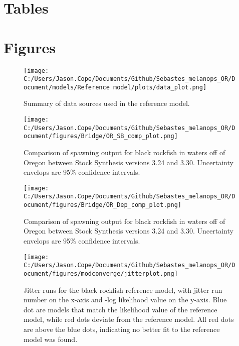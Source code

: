 \documentclass[11pt,
  english,
  letterpaper,
]{article}
\begin{document}
\clearpage

\hypertarget{tables}{%
\section{Tables}\label{tables}}

\clearpage

\hypertarget{figures}{%
\section{Figures}\label{figures}}

\begin{figure}
\centering
\texttt{[image: C:/Users/Jason.Cope/Documents/Github/Sebastes\_melanops\_OR/Document/models/Reference model/plots/data\_plot.png]}
\caption{Summary of data sources used in the reference model.\label{fig:data-plot}}
\end{figure}

\begin{figure}
\centering
\texttt{[image: C:/Users/Jason.Cope/Documents/Github/Sebastes\_melanops\_OR/Document/figures/Bridge/OR\_SB\_comp\_plot.png]}
\caption{Comparison of spawning output for black rockfish in waters off of Oregon between Stock Synthesis versions 3.24 and 3.30. Uncertainty envelops are 95\% confidence intervals.\label{fig:ssb_bridge_comps}}
\end{figure}

\begin{figure}
\centering
\texttt{[image: C:/Users/Jason.Cope/Documents/Github/Sebastes\_melanops\_OR/Document/figures/Bridge/OR\_Dep\_comp\_plot.png]}
\caption{Comparison of spawning output for black rockfish in waters off of Oregon between Stock Synthesis versions 3.24 and 3.30. Uncertainty envelops are 95\% confidence intervals.\label{fig:deps_bridge_comps}}
\end{figure}

\begin{figure}
\centering
\texttt{[image: C:/Users/Jason.Cope/Documents/Github/Sebastes\_melanops\_OR/Document/figures/modconverge/jitterplot.png]}
\caption{Jitter runs for the black rockfish reference model, with jitter run number on the x-axis and -log likelihood value on the y-axis. Blue dot are models that match the likelihood value of the reference model, while red dots deviate from the reference model. All red dots are above the blue dots, indicating no better fit to the reference model was found.\label{fig:jitter}}
\end{figure}
\end{document}
